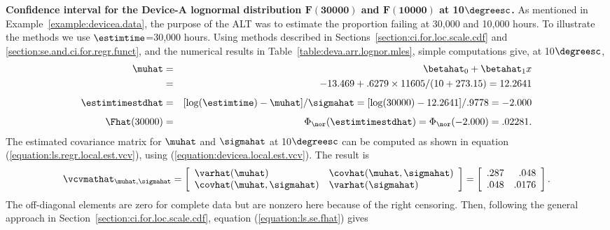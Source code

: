 \begin{example}
{\bf Confidence interval for the Device-A lognormal distribution 
$\boldsymbol{F(30000)}$ and $\boldsymbol{F(10000)}$ at 10$\degreesc$.}
\label{example:ci.fhat.comp}
As mentioned in Example~\ref{example:devicea.data},
the purpose of the ALT was to estimate the proportion failing at
30,000 and 10,000 hours. To illustrate the methods we use 
$\estimtime$=30,000 hours.
Using methods described in Sections~\ref{section:ci.for.loc.scale.cdf} and
\ref{section:se.and.ci.for.regr.funct}, and the numerical results in
Table~\ref{table:deva.arr.lognor.mles}, simple computations give, at
10$\degreesc$,
\begin{eqnarray*}
\muhat & = & \betahat_{0} + \betahat_{1}x\\ 
	& = & -13.469  + .6279 \times 11605/(10+273.15) = 12.2641\\[1ex]
\estimtimestdhat &= & [\log(\estimtime)-\muhat]/\sigmahat
 		= [\log(30000)-12.2641]/.9778=-2.000 \\[1ex]
\Fhat(30000)  &=  & \Phi_{\nor}(\estimtimestdhat) =
\Phi_{\nor}(-2.000) = .02281.
\end{eqnarray*}
The estimated covariance matrix for $\muhat$ and $\sigmahat$ at
10$\degreesc$ can be computed as shown in equation
(\ref{equation:ls.regr.local.est.vcv}), using
(\ref{equation:devicea.local.est.vcv}). The result is
\begin{displaymath}
\vcvmathat_{\muhat,\sigmahat}=
\left[ 
\begin{array}{ll}
\varhat(\muhat)& \covhat(\muhat,\sigmahat)\\
\covhat(\muhat,\sigmahat)& \varhat(\sigmahat)
\end{array}
\right]=
\left[ 
\begin{array}{lr}
 .287 & .048 \\
 .048 & .0176
\end{array}
\right].
\end{displaymath}
The off-diagonal elements are zero for complete data but are
nonzero here because of the right censoring.
Then, following the general approach in
Section~\ref{section:ci.for.loc.scale.cdf}, equation
(\ref{equation:ls.se.fhat}) gives

\end{example}
